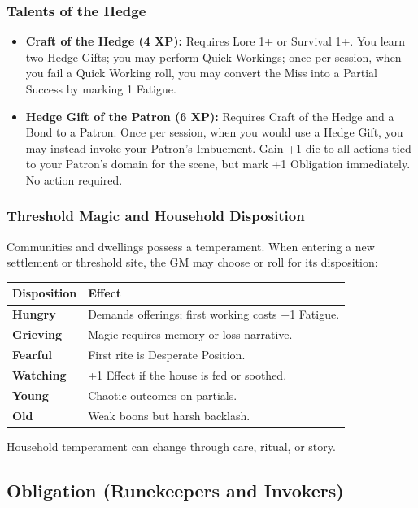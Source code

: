 \subsubsection{Talents of the Hedge}

\begin{itemize}
  \item \textbf{Craft of the Hedge (4 XP):} Requires Lore 1+ or Survival 1+. You learn two Hedge Gifts; you may perform Quick Workings; once per session, when you fail a Quick Working roll, you may convert the Miss into a Partial Success by marking 1 Fatigue.
  \item \textbf{Hedge Gift of the Patron (6 XP):} Requires Craft of the Hedge and a Bond to a Patron. Once per session, when you would use a Hedge Gift, you may instead invoke your Patron's Imbuement. Gain +1 die to all actions tied to your Patron's domain for the scene, but mark +1 Obligation immediately. No action required.
\end{itemize}

\subsubsection{Threshold Magic and Household Disposition}

Communities and dwellings possess a temperament. When entering a new settlement or threshold site, the GM may choose or roll for its disposition:

\begin{longtable}{@{}p{3.5cm}p{8cm}@{}}
\toprule
\textbf{Disposition} & \textbf{Effect} \\
\midrule
\endhead
\bottomrule
\endfoot
\textbf{Hungry} & Demands offerings; first working costs +1 Fatigue. \\
\textbf{Grieving} & Magic requires memory or loss narrative. \\
\textbf{Fearful} & First rite is Desperate Position. \\
\textbf{Watching} & +1 Effect if the house is fed or soothed. \\
\textbf{Young} & Chaotic outcomes on partials. \\
\textbf{Old} & Weak boons but harsh backlash. \\
\bottomrule
\end{longtable}

Household temperament can change through care, ritual, or story.

\subsection{Obligation (Runekeepers and Invokers)}

